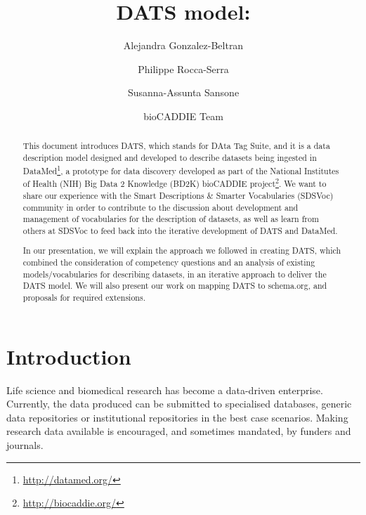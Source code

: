 \documentclass[runningheads,a4paper]{llncs}
\begin{document}
\mainmatter

\title{DATS model: }

\author{Alejandra Gonzalez-Beltran \and
Philippe Rocca-Serra \and
Susanna-Assunta Sansone \and
bioCADDIE Team}
\maketitle

\begin{abstract}
This document introduces DATS, which stands for DAta Tag Suite, and it is a data description model designed and developed to describe datasets being ingested in DataMed\footnote{\url{http://datamed.org/}}, a prototype for data discovery developed as part of the National Institutes of Health (NIH) Big Data 2 Knowledge (BD2K) bioCADDIE project\footnote{\url{http://biocaddie.org/}}. We want to share our experience with the Smart Descriptions \& Smarter Vocabularies (SDSVoc) community in order to contribute to the discussion about development and management of vocabularies for the description of datasets, as well as learn from others at SDSVoc to feed back into the iterative development of DATS and DataMed.

In our presentation, we will explain the approach we followed in creating DATS, which combined the consideration of competency questions and an analysis of existing models/vocabularies for describing datasets, in an iterative approach to deliver the DATS model. We will also present our work on mapping DATS to schema.org, and proposals for required extensions. 
\end{abstract}


\section{Introduction}

Life science and biomedical research has become a data-driven enterprise. Currently, the data produced can be submitted to specialised databases, generic data repositories or institutional repositories in the best case scenarios. Making research data available is encouraged, and sometimes mandated, by funders and journals. 
\end{document}

